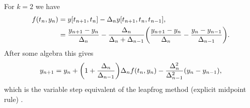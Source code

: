 For $k=2$ we have
\begin{equation}
  \begin{aligned}
    f(t_n, y_n) &= y[t_{n+1}, t_n] - \Delta_{n} y[t_{n+1}, t_n, t_{n-1}] , \\
    &=  \frac{y_{n+1} - y_n}{\Delta_{n}} 
    - \frac{\Delta_{n}}{\Delta_{n} + \Delta_{n-1}} {\left(  \frac{y_{n+1} - y_n}{\Delta_{n}} - \frac{y_n - y_{n-1}}{\Delta_{n-1}} \right)}.
  \end{aligned}
\end{equation}
After some algebra this gives
\begin{equation}
  \label{eq:emr-derivation-rearranged}
  y_{n+1} = y_n + {\left( 1 + \frac{\Delta_{n}}{\Delta_{n-1}} \right)}\Delta_{n} f(t_n, y_n)
    - \frac{\Delta_{n}^2}{\Delta_{n-1}^2}(y_n - y_{n-1}),
\end{equation}
which is the variable step equivalent of the leapfrog method (explicit midpoint rule) \cite[pg. 715]{GreshoSani}.

